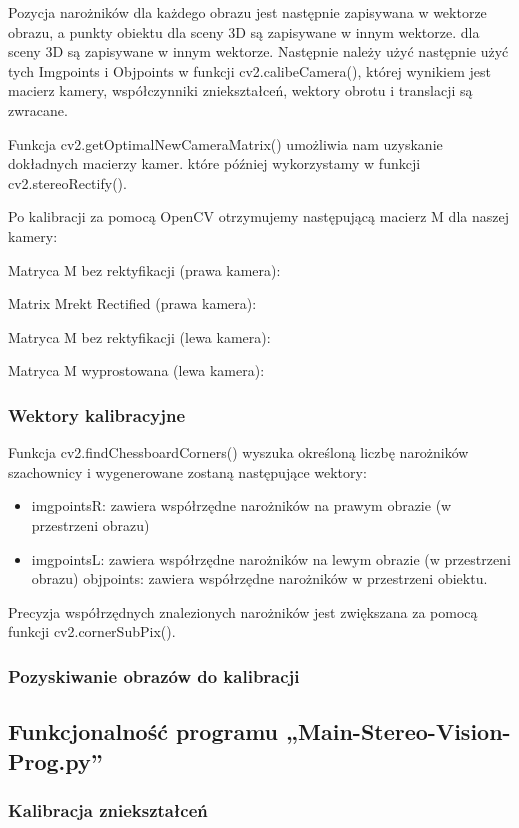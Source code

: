 \documentclass[magisterska]{pracadypl}
\begin{document}
Pozycja narożników dla każdego obrazu jest następnie zapisywana w wektorze obrazu, a punkty obiektu dla sceny 3D są zapisywane w innym wektorze.
dla sceny 3D są zapisywane w innym wektorze. Następnie należy użyć
następnie użyć tych Imgpoints i Objpoints w funkcji cv2.calibeCamera(), której wynikiem jest
macierz kamery, współczynniki zniekształceń, wektory obrotu i translacji
są zwracane.

Funkcja cv2.getOptimalNewCameraMatrix() umożliwia nam uzyskanie dokładnych macierzy kamer.
które później wykorzystamy w funkcji cv2.stereoRectify().

Po kalibracji za pomocą OpenCV otrzymujemy następującą macierz M dla naszej kamery:

Matryca M bez rektyfikacji (prawa kamera):

Matrix Mrekt Rectified (prawa kamera):

Matryca M bez rektyfikacji (lewa kamera):

Matryca M wyprostowana (lewa kamera):

\subsubsection{Wektory kalibracyjne}

Funkcja cv2.findChessboardCorners() wyszuka określoną liczbę narożników szachownicy
i wygenerowane zostaną następujące wektory:

\begin{itemize}
  \item imgpointsR: zawiera współrzędne narożników na prawym obrazie (w przestrzeni obrazu)
  \item imgpointsL: zawiera współrzędne narożników na lewym obrazie (w przestrzeni obrazu)
  \itme objpoints: zawiera współrzędne narożników w przestrzeni obiektu.
\end{itemize}

Precyzja współrzędnych znalezionych narożników jest zwiększana za pomocą funkcji
cv2.cornerSubPix().

\subsubsection{Pozyskiwanie obrazów do kalibracji}
\subsection{Funkcjonalność programu „Main-Stereo-Vision-Prog.py”}
\subsubsection{Kalibracja zniekształceń}
\end{document}
